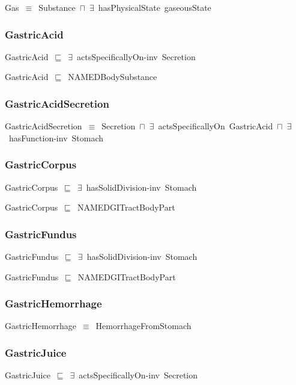 \documentclass{article}
\begin{document}
Gas~\ensuremath{\equiv}~Substance~\ensuremath{\sqcap}~\ensuremath{\exists}~hasPhysicalState~gaseousState

\subsubsection*{GastricAcid}

GastricAcid~\ensuremath{\sqsubseteq}~\ensuremath{\exists}~actsSpecificallyOn-inv~Secretion~

GastricAcid~\ensuremath{\sqsubseteq}~NAMEDBodySubstance~

\subsubsection*{GastricAcidSecretion}

GastricAcidSecretion~\ensuremath{\equiv}~Secretion~\ensuremath{\sqcap}~\ensuremath{\exists}~actsSpecificallyOn~GastricAcid~\ensuremath{\sqcap}~\ensuremath{\exists}~hasFunction-inv~Stomach

\subsubsection*{GastricCorpus}

GastricCorpus~\ensuremath{\sqsubseteq}~\ensuremath{\exists}~hasSolidDivision-inv~Stomach~

GastricCorpus~\ensuremath{\sqsubseteq}~NAMEDGITractBodyPart~

\subsubsection*{GastricFundus}

GastricFundus~\ensuremath{\sqsubseteq}~\ensuremath{\exists}~hasSolidDivision-inv~Stomach~

GastricFundus~\ensuremath{\sqsubseteq}~NAMEDGITractBodyPart~

\subsubsection*{GastricHemorrhage}

GastricHemorrhage~\ensuremath{\equiv}~HemorrhageFromStomach

\subsubsection*{GastricJuice}

GastricJuice~\ensuremath{\sqsubseteq}~\ensuremath{\exists}~actsSpecificallyOn-inv~Secretion~
\end{document}
